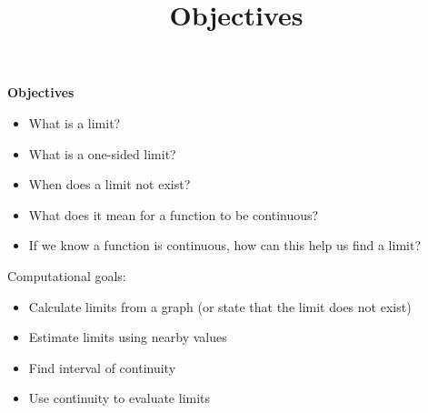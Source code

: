 \documentclass{ximera}
\title{Objectives}
\begin{document}
\begin{abstract}
\end{abstract}

\maketitle


\textbf{Objectives}


\begin{itemize}
    \item What is a limit?
    \item What is a one-sided limit?
    \item When does a limit not exist?
    \item What does it mean for a function to be continuous?
    \item If we know a function is continuous, how can this help us find a limit?
\end{itemize}

Computational goals:

\begin{itemize}
    \item Calculate limits from a graph (or state that the limit does not exist)
    \item Estimate limits using nearby values
    \item Find interval of continuity
    \item Use continuity to evaluate limits
\end{itemize}
\end{document}
